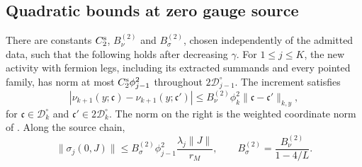 \documentclass[11pt,letterpaper,reqno]{amsart}
\makeatletter
\theoremstyle{definition}
\newcommand{\ms@minorstart}{%
  \pushQED{\qed}\renewcommand{\qedsymbol}{$\blacksquare$}}
\newenvironment{proposition}[1][]{\ms@minorstart\ms@proposition[#1]}
  {\popQED\endms@proposition}
\theoremstyle{remark}
\makeatother
\begin{document}
\subsection{Quadratic bounds at zero gauge source}

\begin{proposition}\label{C-407-42}
There are constants $C_2^{\rm s}$, $B_\nu^{(2)}$ and
$B_\sigma^{(2)}$, chosen independently of the admitted data,
such that the following holds after decreasing $\gamma$.
For $1\le j\le K$, the new activity with fermion legs, including
its extracted summands and every pointed family, has norm at
most $C_2^{\rm s}\phi_{j-1}^2$ throughout
$2\mathscr D_{j-1}^\circ$.  The increment satisfies
\begin{equation}\label{eq:qcdm2-quadratic-increment}
 |\nu_{k+1}(y;\mathfrak c)-\nu_{k+1}(y;\mathfrak c')|
 \le B_\nu^{(2)}\phi_k^2
        \|\mathfrak c-\mathfrak c'\|_{k,y},
\end{equation}
for $\mathfrak c\in\mathscr D_k^\circ$ and
$\mathfrak c'\in2\mathscr D_k^\circ$.
The norm on the right is the weighted coordinate norm of
\cite[Prop. 10.1]{QCDM1}.  Along the source chain,
\begin{equation}\label{eq:qcdm2-quadratic-chain}
 \|\sigma_j(0,J)\|\le
 B_\sigma^{(2)}\phi_{j-1}^2
          \frac{\lambda_j\|J\|}{r_M},
 \qquad
 B_\sigma^{(2)}=\frac{B_\nu^{(2)}}{1-4/L}.
\end{equation}
\end{proposition}
\end{document}
